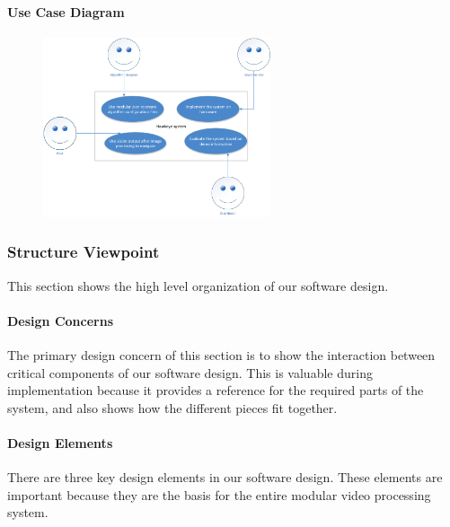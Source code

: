 	\paragraph{Use Case Diagram}
		\begin{figure}[!ht] %
		\centering
		\includegraphics[width=0.6\textwidth,natwidth=610,natheight=642]{images/UseCase_Diagram.png}  
		\end{figure}
	
\subsubsection{Structure Viewpoint}
This section shows the high level organization of our software design.  
	\paragraph{Design Concerns}
	The primary design concern of this section is to show the interaction between critical components of our software design. This is valuable during implementation because it provides a reference for the required parts of the system, and also shows how the different pieces fit together.\\
	\paragraph{Design Elements}
	There are three key design elements in our software design. These elements are important because they are the basis for the entire modular video processing system.\\
	
